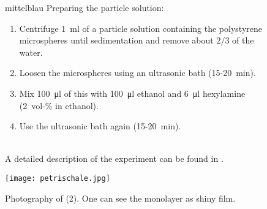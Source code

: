 \setcounter{figure}{4}
\begin{figure}[htbp]
\begin{minipage}[t][][t]{0.68\textwidth}
    \large
    \begin{color}{mittelblau}
        Preparing the particle solution: \cite{manual}
    \end{color}
    \normalsize
    \begin{enumerate}
        \item Centrifuge \SI{1}{\milli\litre} of a particle solution containing the polystyrene microspheres until sedimentation and remove about $2/3$ of the water.
        \item Loosen the microspheres using an ultrasonic bath (15-\SI{20}{\minute}).
        \item Mix \SI{100}{\micro\litre} of this with \SI{100}{\micro\litre} ethanol and \SI{6}{\micro\litre} hexylamine (\SI{2}{vol}-\si{\percent} in ethanol).
        \item Use the ultrasonic bath again (15-\SI{20}{\minute}).
    \end{enumerate}
    \ \\
    A detailed description of the experiment can be found in \cite{wollet10a}.
\end{minipage}
\hfill
\begin{minipage}[t][][b]{0.28\textwidth}
    \texttt{[image: petrischale.jpg]}
    \caption{Photography of (2).
        One can see the monolayer as shiny film. \cite{manual}}
\end{minipage}
\end{figure}